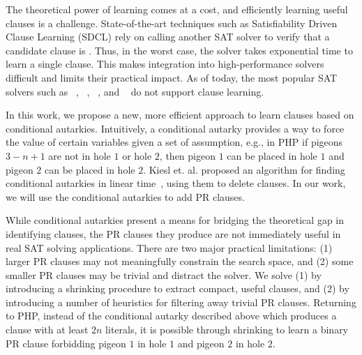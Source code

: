 The theoretical power of \pr learning comes at a cost, and efficiently learning useful \pr clauses is a challenge. State-of-the-art techniques such as Satisfiability Driven Clause Learning (SDCL) rely on calling another SAT solver to verify that a candidate clause is \pr \cite{sadical}. 
Thus, in the worst case, the solver takes exponential time to learn a single \pr clause. This makes integration into high-performance solvers difficult and limits their practical impact. As of today, the most popular SAT solvers such as \cadical~\cite{cadical}, \kissat~\cite{kissat}, \cryptoMiniSAT~\cite{cryptominisat}, and \lingeling~\cite{lingeling} do not support \pr clause learning.

In this work, we propose a new, more efficient approach to learn \pr clauses based on conditional autarkies. 
Intuitively, a conditional autarky provides a way to force the value of certain variables given a set of assumption, e.g., 
in PHP if pigeons $3 - n+1$ are not in hole $1$ or hole $2$, then pigeon $1$ can be placed in hole $1$ and pigeon $2$ can be placed in hole $2$. 
Kiesl et. al. proposed an algorithm for finding conditional autarkies in linear time~\cite{conditionalautarkies}, using them to delete clauses.
In our work, we  will use the conditional autarkies to add PR clauses. 
%

While conditional autarkies present a means for bridging the theoretical gap in identifying \pr clauses, 
the PR clauses they produce are not immediately useful in real SAT solving applications. 
There are two major practical limitations: (1) larger PR clauses may not meaningfully constrain the search space, and (2) some smaller PR clauses may be trivial and distract the solver. We solve (1) by introducing a shrinking procedure to extract compact, useful \pr clauses, and (2) by introducing a number of heuristics for filtering away trivial PR clauses. 
Returning to PHP, instead of the conditional autarky described above which produces a clause with at least $2n$ literals, it is possible through shrinking to learn a binary PR clause forbidding pigeon $1$ in hole $1$ and pigeon $2$ in hole $2$.


